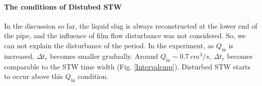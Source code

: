 \documentclass[aps,pre,preprint,groupedaddress,showkeys]{revtex4-2}
\begin{document}



\paragraph{The conditions of Distubed STW}
In the discussion so far, the liquid slug is always reconstructed at the lower end of the pipe, and the influence of film flow disturbance was not considered. 
So, we can not explain the disturbance of the period.
In the experiment, as $ Q_ \mathrm {in} $ is increased, $ \Delta t_r $ becomes smaller gradually. 
Around $ Q_ \mathrm{in} \sim \SI{0.7} {cm^ 3 / s}$, $ \Delta t_r $ becomes comparable to the STW time width (Fig. \ref{Intervalcmp}).
Disturbed STW starts to occur above this $ Q_ \mathrm {in} $ condition.
\end{document}
